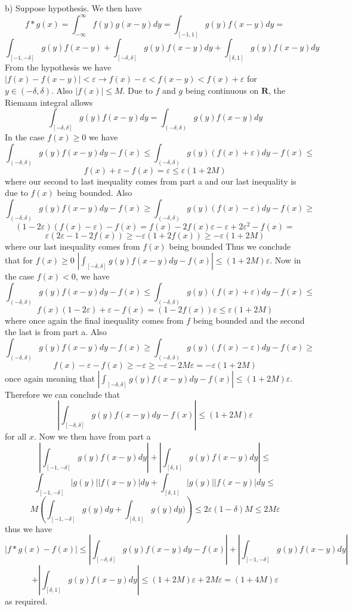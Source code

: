 \documentclass[12pt]{article}
\begin{document}
b) Suppose hypothesis. We then have 
\[f*g(x) = \int_{-\infty}^\infty f(y)g(x-y) dy =\int_{[-1,1]} g(y)f(x-y) dy =\]\[\int_{[-1,-\delta]} g(y)f(x-y) +\int_{[-\delta,\delta]} g(y)f(x-y) dy +\int_{[\delta,1]} g(y)f(x-y)dy   \] From the hypothesis we have $ |f(x)-f(x-y)| < \varepsilon\rightarrow f(x)-\varepsilon<f(x-y) < f(x) + \varepsilon$ for $ y\in (-\delta,\delta)$. Also $ |f(x)| \leq M$. Due to $f$ and $g$ being continuous on $\textbf{R}$, the Riemann integral allows
\[\int_{[-\delta,\delta]}g(y)f(x-y) dy  = \int_{(-\delta,\delta)} g(y) f(x-y) dy\] In the case $ f(x) \geq 0$ we have
\[ \int_{(-\delta,\delta)} g(y) f(x-y) dy-f(x)\leq \int_{(-\delta,\delta)} g(y)(f(x)+\varepsilon)dy-f(x) \leq \]
\[ f(x)+\varepsilon-f(x) = \varepsilon \leq \varepsilon(1+2M)\] where our second to last inequality comes from part a and our last inequality is due to $f(x)$ being bounded. Also
\[\int_{(-\delta,\delta)}g(y)f(x-y) dy-f(x) \geq \int_{(-\delta,\delta)}g(y)(f(x)-\varepsilon) dy-f(x)\geq\] \[(1-2\varepsilon)(f(x) - \varepsilon)-f(x) = f(x)-2f(x)\varepsilon - \varepsilon+2\varepsilon^2-f(x) =\] \[\varepsilon(2\varepsilon -1-2f(x))\geq-\varepsilon(1+2f(x))\geq -\varepsilon(1+2M)\] where our last inequality comes from $f(x)$ being bounded Thus we conclude that for  $f(x) \geq 0$
$|\int_{[-\delta,\delta]}g(y)f(x-y) dy - f(x)| \leq (1+2M)\varepsilon$. Now in the case $ f(x) < 0$, we have 
\[ \int_{(-\delta,\delta)} g(y) f(x-y) dy-f(x)\leq \int_{(-\delta,\delta)} g(y)(f(x)+\varepsilon)dy-f(x) \leq\] \[f(x)(1-2\varepsilon) + \varepsilon -f(x) = (1-2f(x))\varepsilon \leq \varepsilon(1+2M)\] where once again the final inequality comes from $f$ being bounded and the second the last is from part a. Also
\[\int_{(-\delta,\delta)}g(y)f(x-y) dy-f(x) \geq \int_{(-\delta,\delta)}g(y)(f(x)-\varepsilon) dy-f(x)\geq\] \[f(x) - \varepsilon - f(x) \geq -\varepsilon \geq -\varepsilon-2M\varepsilon = -\varepsilon(1+2M)\] once again meaning that 
$|\int_{[-\delta,\delta]}g(y)f(x-y) dy - f(x)| \leq (1+2M)\varepsilon$. Therefore we can conclude that 
\[\left|\int_{[-\delta,\delta]}g(y)f(x-y) dy - f(x)\right| \leq (1+2M)\varepsilon\] for all $x$. Now we then have from part a
\[\left|\int_{[-1,-\delta]} g(y)f(x-y)dy\right|+\left| \int_{[\delta,1]} g(y)f(x-y)dy\right|\leq\]\[\int_{[-1,-\delta]} |g(y)||f(x-y)|dy+ \int_{[\delta,1]} |g(y)||f(x-y)|dy\leq\]\[M\left(\int_{[-1,-\delta]} g(y)dy +\int_{[\delta,1]} g(y)dy)\right) \leq 2\varepsilon(1-\delta)M \leq 2 M \varepsilon\] thus we have
\[|f*g(x) - f(x)|\leq\left|\int_{[-\delta,\delta]}g(y)f(x-y) dy - f(x)\right| +\left|\int_{[-1,-\delta]} g(y)f(x-y)dy\right|\]\[+\left| \int_{[\delta,1]} g(y)f(x-y)dy\right| \leq(1+2M)\varepsilon + 2M\varepsilon = (1+4M)\varepsilon\] as required.
\end{document}
